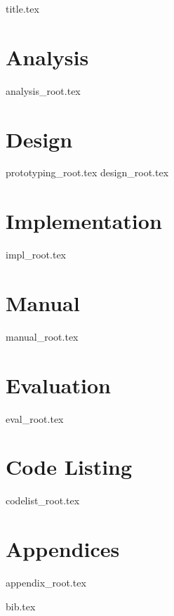 \documentclass[a4paper, 12pt]{scrartcl}
\begin{document}
{title.tex}

\begin{footnotesize}
\tableofcontents
\end{footnotesize}

\pagebreak

\section{Analysis}
{analysis_root.tex}
\pagebreak

\section{Design}
{prototyping_root.tex}
{design_root.tex}
\pagebreak

\section{Implementation}
{impl_root.tex}
\pagebreak

\section{Manual}
{manual_root.tex}
\pagebreak

\section{Evaluation}
{eval_root.tex}
\pagebreak

\section{Code Listing}
{codelist_root.tex}
\pagebreak

\appendix
\section*{Appendices}
\renewcommand{\thesubsection}{\Alph{subsection}}
{appendix_root.tex}
\pagebreak

{bib.tex}
\end{document}
